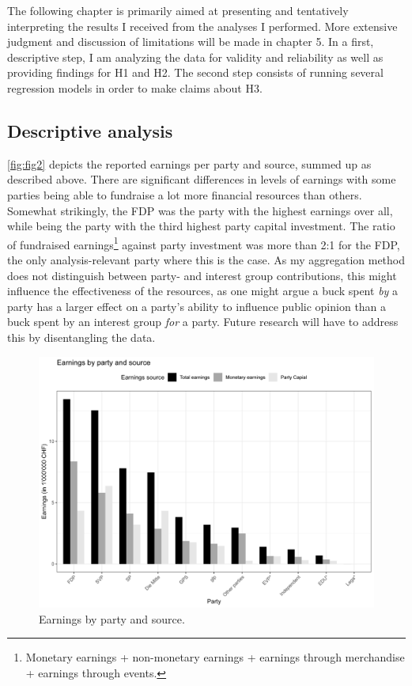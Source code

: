 \documentclass[11pt,a4paper]{article}
\begin{document}
The following chapter is primarily aimed at presenting and tentatively interpreting the results I received from the analyses I performed. More extensive judgment and discussion of limitations will be made in chapter 5. In a first, descriptive step, I am analyzing the data for validity and reliability as well as providing findings for H1 and H2. The second step consists of running several regression models in order to make claims about H3.

\subsection{Descriptive analysis}
\autoref{fig:fig2} depicts the reported earnings per party and source, summed up as described above. There are significant differences in levels of earnings with some parties being able to fundraise a lot more financial resources than others. Somewhat strikingly, the FDP was the party with the highest earnings over all, while being the party with the third highest party capital investment. The ratio of fundraised earnings\footnote{Monetary earnings + non-monetary earnings + earnings through merchandise + earnings through events.} against party investment was more than 2:1 for the FDP, the only analysis-relevant party where this is the case. As my aggregation method does not distinguish between party- and interest group contributions, this might influence the effectiveness of the resources, as one might argue a buck spent \textit{by} a party has a larger effect on a party’s ability to influence public opinion than a buck spent by an interest group \textit{for} a party. Future research will have to address this by disentangling the data.

\begin{figure}
    \centering
    \includegraphics[width=1\linewidth]{output/plots/plot_figure_2.png}
    \caption{Earnings by party and source.}
    \label{fig:fig2}
\end{figure}
\end{document}
